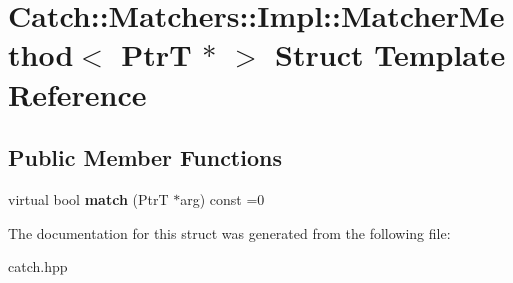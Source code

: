 \hypertarget{struct_catch_1_1_matchers_1_1_impl_1_1_matcher_method_3_01_ptr_t_01_5_01_4}{}\section{Catch\+:\+:Matchers\+:\+:Impl\+:\+:Matcher\+Method$<$ PtrT $\ast$ $>$ Struct Template Reference}
\label{struct_catch_1_1_matchers_1_1_impl_1_1_matcher_method_3_01_ptr_t_01_5_01_4}
\subsection*{Public Member Functions}
\begin{DoxyCompactItemize}
\item 
\mbox{\label{struct_catch_1_1_matchers_1_1_impl_1_1_matcher_method_3_01_ptr_t_01_5_01_4_a5fdd64f9509724f32ffc73cb320181d1}} 
virtual bool {\bfseries match} (PtrT $\ast$arg) const =0
\end{DoxyCompactItemize}


The documentation for this struct was generated from the following file\+:\begin{DoxyCompactItemize}
\item 
catch.\+hpp\end{DoxyCompactItemize}
